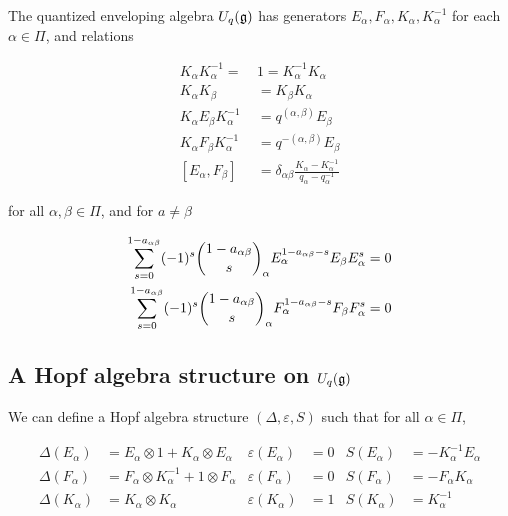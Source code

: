     \begin{defn}
        The quantized enveloping algebra $U_q(\mathfrak{g})$ has generators
        $E_\alpha, F_\alpha, K_\alpha, K_\alpha^{-1}$ for each $\alpha \in
        \Pi$, and relations

        \begin{align}
            K_\alpha K_\alpha^{-1} =\ &1  = K_\alpha^{-1}K_\alpha \\
            K_\alpha K_\beta &= K_\beta K_\alpha \\
            K_\alpha E_\beta K_\alpha^{-1} &= q^{(\alpha, \beta)} E_\beta \\
            K_\alpha F_\beta K_\alpha^{-1} &= q^{-(\alpha, \beta)} E_\beta \\
            [E_\alpha, F_\beta] &= \delta_{\alpha\beta} \frac{K_\alpha - K_\alpha^{-1}}{ q_\alpha - q_\alpha^{-1}} 
        \end{align}

        for all $\alpha, \beta \in \Pi$, and for $a \neq \beta$

        \begin{align}
            \sum_{s=0}^{1-a_{\alpha\beta}} (-1)^s \dbinom{1-a_{\alpha\beta}}{s}_\alpha E_\alpha^{1-a_{\alpha\beta} - s} E_\beta E_\alpha^s  &= 0 \\
            \sum_{s=0}^{1-a_{\alpha\beta}} (-1)^s \dbinom{1-a_{\alpha\beta}}{s}_\alpha F_\alpha^{1-a_{\alpha\beta} - s} F_\beta F_\alpha^s  &= 0 
        \end{align}
    \end{defn}
    \subsection{A Hopf algebra structure on $U_q(\mathfrak{g})$}

    We can define a Hopf algebra structure $(\Delta, \varepsilon, S)$ such
    that for all $\alpha \in \Pi$,

    \begin{align}
        \Delta(E_\alpha) &= E_\alpha \otimes 1 + K_\alpha \otimes E_\alpha      & \varepsilon(E_\alpha) &= 0  & S(E_\alpha) &= -K_\alpha^{-1} E_\alpha \\
        \Delta(F_\alpha) &= F_\alpha \otimes K_\alpha^{-1} + 1 \otimes F_\alpha & \varepsilon(F_\alpha) &= 0  & S(F_\alpha) &= -F_\alpha K_\alpha \\
        \Delta(K_\alpha) &= K_\alpha \otimes K_\alpha                           & \varepsilon(K_\alpha) &= 1  & S(K_\alpha) &= K_\alpha^{-1}
    \end{align}
